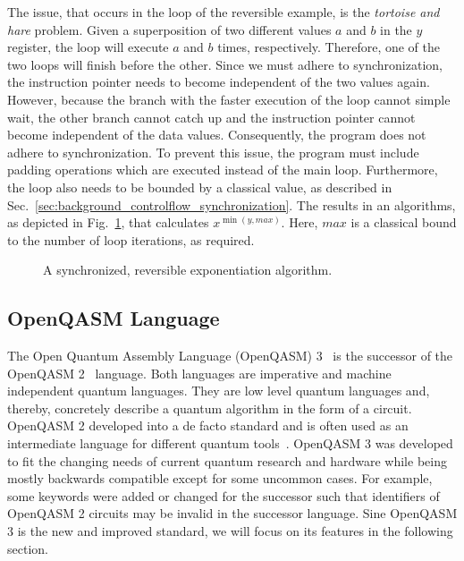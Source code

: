 The issue, that occurs in the loop of the reversible example, is the \emph{tortoise and hare} problem. Given a superposition of two different values $a$ and $b$ in the $y$ register, the loop will execute $a$ and $b$ times, respectively. Therefore, one of the two loops will finish before the other. Since we must adhere to synchronization, the instruction pointer needs to become independent of the two values again. However, because the branch with the faster execution of the loop cannot simple wait, the other branch cannot catch up and the instruction pointer cannot become independent of the data values. Consequently, the program does not adhere to synchronization. 
To prevent this issue, the program must include padding operations which are executed instead of the main loop. Furthermore, the loop also needs to be bounded by a classical value, as described in Sec.~\ref{sec:background_controlflow_synchronization}. The results in an algorithms, as depicted in Fig.~\ref{fig:qcm_sync}, that calculates $x^{\min{(y, max)}}$. Here, $max$ is a classical bound to the number of loop iterations, as required.

\begin{figure}[htp]
    \centering     
    
    \caption{A synchronized, reversible exponentiation algorithm.}
    \label{fig:qcm_sync}
\end{figure}

\subsection{OpenQASM Language}
\label{sec:background_qasm}
The Open Quantum Assembly Language (OpenQASM) 3~\cite{CJA*22} is the successor of the OpenQASM 2~\cite{CBSG17} language.
Both languages are imperative and machine independent quantum languages. They are low level quantum languages and, thereby, concretely describe a quantum algorithm in the form of a circuit. OpenQASM 2 developed into a de facto standard and is often used as an intermediate language for different quantum tools~\cite{CJA*22}. OpenQASM 3 was developed to fit the changing needs of current quantum research and hardware while being mostly backwards compatible except for some uncommon cases. For example, some keywords were added or changed for the successor such that identifiers of OpenQASM 2 circuits may be invalid in the successor language. Sine OpenQASM 3 is the new and improved standard, we will focus on its features in the following section.

